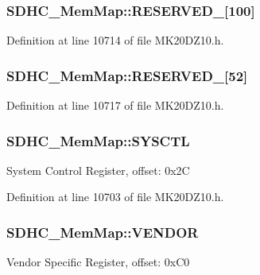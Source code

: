 \subsubsection[{\texorpdfstring{R\+E\+S\+E\+R\+V\+E\+D\+\_\+1}{RESERVED_1}}]{ S\+D\+H\+C\+\_\+\+Mem\+Map\+::\+R\+E\+S\+E\+R\+V\+E\+D\+\_\mbox{[}100\mbox{]}}\hypertarget{struct_s_d_h_c___mem_map_aa156aaa0eab63d8d7d2ac4d9dddeb0b2}{}\label{struct_s_d_h_c___mem_map_aa156aaa0eab63d8d7d2ac4d9dddeb0b2}


Definition at line 10714 of file M\+K20\+D\+Z10.\+h.

\subsubsection[{\texorpdfstring{R\+E\+S\+E\+R\+V\+E\+D\+\_\+2}{RESERVED_2}}]{ S\+D\+H\+C\+\_\+\+Mem\+Map\+::\+R\+E\+S\+E\+R\+V\+E\+D\+\_\mbox{[}52\mbox{]}}\hypertarget{struct_s_d_h_c___mem_map_ad593c098233cbb60497a364b88d113b8}{}\label{struct_s_d_h_c___mem_map_ad593c098233cbb60497a364b88d113b8}


Definition at line 10717 of file M\+K20\+D\+Z10.\+h.

\subsubsection[{\texorpdfstring{S\+Y\+S\+C\+TL}{SYSCTL}}]{ S\+D\+H\+C\+\_\+\+Mem\+Map\+::\+S\+Y\+S\+C\+TL}\hypertarget{struct_s_d_h_c___mem_map_ae3204e728de4488f0b3569d1ebac78ae}{}\label{struct_s_d_h_c___mem_map_ae3204e728de4488f0b3569d1ebac78ae}
System Control Register, offset\+: 0x2C 

Definition at line 10703 of file M\+K20\+D\+Z10.\+h.

\subsubsection[{\texorpdfstring{V\+E\+N\+D\+OR}{VENDOR}}]{ S\+D\+H\+C\+\_\+\+Mem\+Map\+::\+V\+E\+N\+D\+OR}\hypertarget{struct_s_d_h_c___mem_map_ac3938ee338b7499c8b1cebed71604299}{}\label{struct_s_d_h_c___mem_map_ac3938ee338b7499c8b1cebed71604299}
Vendor Specific Register, offset\+: 0x\+C0 


